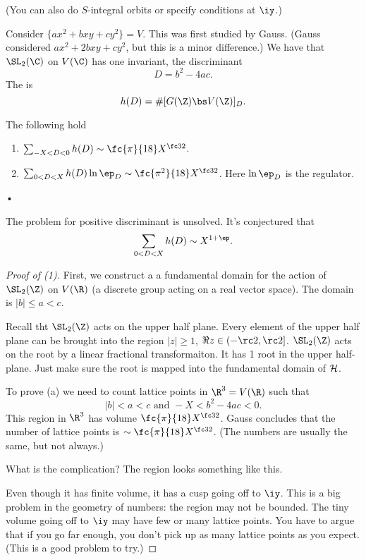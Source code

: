 (You can also do $S$-integral orbits or specify conditions at $\iy$.)

\begin{ex}
Consider $\{ax^2+bxy+cy^2\}=V$. This was first studied by Gauss. %
(Gauss considered $ax^2+2bxy+cy^2$,  %
but this is a minor difference.) We have that $\SL_2(\C)$ on $V(\C)$ has one invariant, the discriminant
\[
D= b^2-4ac.
\]
The  is
\[
h(D) = \#[G(\Z)\bs V(\Z)]_D.
\]
\end{ex}

\begin{thm}
The following hold
\begin{enumerate}
\item
$\sum_{-X< D<0} h(D) \sim \fc{\pi}{18} X^{\fc 32}$.
\item
$\sum_{0<D<X}h(D) \ln \ep_D \sim \fc{\pi^2}{18} X^{\fc 32}$. Here $\ln \ep_D$ is the regulator.
\end{enumerate}•
\end{thm}
The problem for positive discriminant is unsolved. It's conjectured that
\[\sum_{0<D<X} h(D) \sim X^{1+\ep}.\] 

\begin{proof}[Proof of (1)]
First, we construct a a fundamental domain for the action of $\SL_2(\Z)$ on $V(\R)$ (a discrete group acting on a real vector space).  %
The domain is $|b|\le a<c$.

Recall tht $\SL_2(\Z)$ acts on the upper half plane. Every element of the upper half plane can be brought into the region $|z|\ge 1$, $\Re z\in (-\rc2,\rc2]$. %
$\SL_2(\Z)$ acts on the root by a linear fractional transformaiton. It has 1 root in the upper half-plane. Just make sure the root is mapped into the fundamental domain of $\cal H$. %

To prove (a) we need to count lattice points in $\R^3=V(\R)$ such that 
\[|b|<a<c\text{ and }-X<b^2 - 4ac<0.\] 
This region in $\R^3$ has volume $\fc{\pi}{18}X^{\fc 32}$. Gauss concludes that the number of lattice points is $\sim \fc{\pi}{18}X^{\fc 32}$. (The numbers are usually the same, but not always.)

What is the complication? The region looks something like this.

Even though it has finite volume, it has a cusp going off to $\iy$. This is a big problem in the geometry of numbers: the region may not be bounded. %
The tiny volume going off to $\iy$ may have few or many lattice points. You have to argue that if you go far enough, you don't pick up as many lattice points as you expect. (This is a good problem to try.)
\end{proof}

